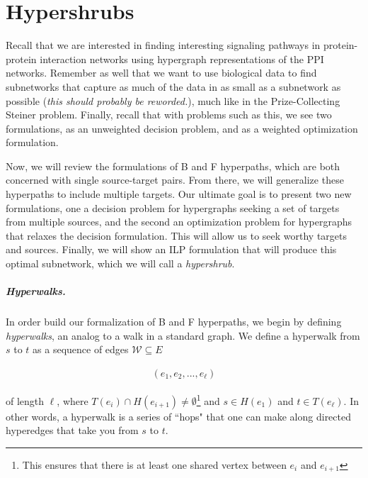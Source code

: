 \documentclass[12pt,twoside]{reedthesis}
\theoremstyle{definition}
\begin{document}
\chapter{Hypershrubs}

Recall that we are interested in finding interesting signaling pathways in protein-protein interaction networks using hypergraph representations of the PPI networks. Remember as well that we want to use biological data to find subnetworks that capture as much of the data in as small as a subnetwork as possible (\emph{this should probably be reworded.}), much like in the Prize-Collecting Steiner problem. Finally, recall that with problems such as this, we see two formulations, as an unweighted decision problem, and as a weighted optimization formulation.\par

Now, we will review the formulations of B and F hyperpaths, which are both concerned with single source-target pairs. From there, we will generalize these hyperpaths to include multiple targets. Our ultimate goal is to present two new formulations, one a decision problem for hypergraphs seeking a set of targets from multiple sources, and the second an optimization problem for hypergraphs that relaxes the decision formulation. This will allow us to seek worthy targets and sources. Finally, we will show an ILP formulation that will produce this optimal subnetwork, which we will call a \textit{hypershrub}.\par

\paragraph{Hyperwalks.}In order build our formalization of B and F hyperpaths, we begin by defining \textit{hyperwalks}, an analog to a walk in a standard graph. We define a hyperwalk from $s$ to $t$ as a sequence of edges $\mathcal{W} \subseteq E$

\begin{align*}
  (e_1,e_2,...,e_\ell)
\end{align*}

of length $\ell$, where $T(e_i) \cap H(e_{i+1}) \neq \emptyset$\footnote{This ensures that there is at least one shared vertex between $e_i$ and $e_{i+1}$} and $s \in H(e_1)$ and $t \in T(e_\ell)$. In other words, a hyperwalk is a series of ``hops" that one can make along directed hyperedges that take you from $s$ to $t$.\par
\end{document}
